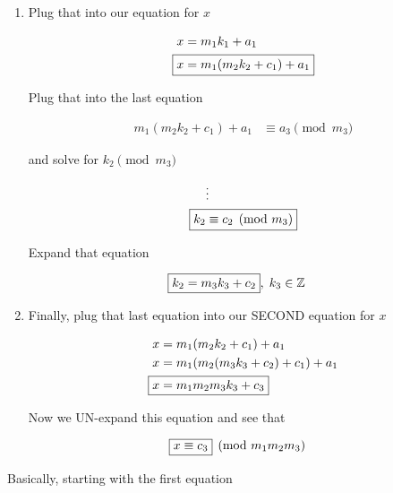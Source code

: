 \documentclass[../../Main.tex]{subfiles}
\begin{document}
\begin{enumerate}
    \item 
    {
        Plug that into our equation for $x$

        \begin{align*}
            x &= m_1 k_1 + a_1 \\
            \Aboxed{x &= m_1 (m_2 k_2 + c_1) + a_1} \\
        \end{align*}

        Plug that into the last equation

        \begin{align*}
            m_1 (m_2 k_2 + c_1) + a_1 &\equiv a_3 \pmod{m_3}
        \end{align*}

        and solve for $k_2 \pmod{m_3}$

        \begin{align*}
            &\vdots \\
            \Aboxed{k_2 &\equiv c_2 \pmod{m_3}} \\
        \end{align*}

        Expand that equation

        \begin{align*}
            \Aboxed{k_2 = m_3 k_3 + c_2}, \; k_3 \in \setZ
        \end{align*}
    }

    \item 
    {
        Finally, plug that last equation into our SECOND equation for $x$

        \begin{align*}
            x &= m_1 (m_2 k_2 + c_1) + a_1 \\
            x &= m_1(m_2(m_3 k_3 + c_2) + c_1) + a_1 \\
            \Aboxed{x &= m_1m_2m_3k_3 + c_3} \\
        \end{align*}

        Now we UN-expand this equation and see that

        \begin{align*}
            \Aboxed{x &\equiv c_3} \pmod{m_1m_2m_3}
        \end{align*}
    }

\end{enumerate}

Basically, starting with the first equation
\end{document}
